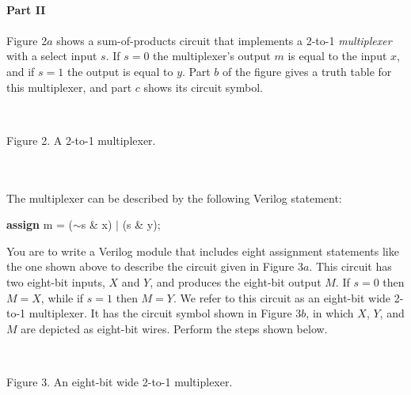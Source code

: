 \documentclass[psfig,10pt,fullpage]{article}
\begin{document}
~\\
\noindent
{\bf Part II}
~\\
~\\
\noindent
Figure 2$a$ shows a sum-of-products circuit that implements
a 2-to-1 {\it multiplexer} with a select input $s$.
If $s = 0$ the multiplexer's output $m$ is equal to the input $x$, and if $s=1$ the
output is equal to $y$. Part $b$ of the figure gives a truth table for this
multiplexer, and part $c$ shows its circuit symbol. 

\begin{figure}[H]
\scriptsize
\centerline{
\hbox{}}
\end{figure}
~\\
\centerline{Figure 2.  A 2-to-1 multiplexer.}
~\\
~\\

The multiplexer can be described by the following Verilog statement:

\begin{center}
\begin{minipage}[t]{12.5 cm}
\begin{tabbing}
{\bf assign} m = ($\sim$s \& x) $\mid$ (s \& y);
\end{tabbing}
\end{minipage}
\end{center}

You are to write a Verilog module that includes eight
assignment statements like the one shown above to describe the circuit given in Figure
3$a$. This circuit has two eight-bit inputs, $X$ and $Y$, and produces the eight-bit output
$M$. If $s=0$ then $M = X$, while if $s=1$ then $M=Y$. We refer to this circuit as an eight-bit
wide 2-to-1 multiplexer. It has the circuit symbol shown in Figure 3$b$, in which $X$,
$Y$, and $M$ are depicted as eight-bit wires. Perform the steps shown below.

\begin{figure}[H]
\scriptsize
\centerline{
\hbox{}}
\end{figure}
~\\
\centerline{Figure 3.  An eight-bit wide 2-to-1 multiplexer.}
~\\
\end{document}
